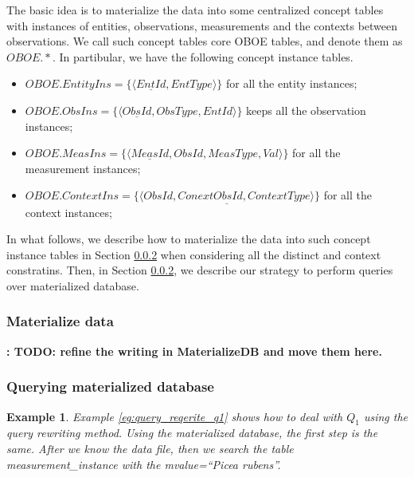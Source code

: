 \documentclass[conference]{IEEEtran}
\newtheorem{example}{Example}[section]
\begin{document}
The basic idea is to materialize the data into some centralized
concept tables with instances of entities, observations, measurements
and the contexts between observations. 
We call such concept tables core OBOE tables, and denote them as
$OBOE.*$. 
In partibular, we have the following concept instance tables. 
\begin{itemize}
\item $OBOE.EntityIns=\{\langle \underline{EntId}, EntType\rangle\}$ for all the entity instances;
\item $OBOE.ObsIns=\{\langle \underline{ObsId}, ObsType, EntId \rangle\}$ keeps all the observation instances;
\item $OBOE.MeasIns=\{\langle \underline{MeasId}, ObsId, MeasType, Val\rangle\}$ for all the measurement instances;
\item $OBOE.ContextIns =\{\langle \underline{ObsId, ConextObsId, ContextType}\rangle\}$ for all the context instances;
\end{itemize}

In what follows, we describe how to materialize the data into such
concept instance tables in Section \ref{sec:materialilzedb} when
considering all the distinct and context constratins. 
Then, in Section \ref{sec:materialilzedb}, we describe our strategy to
perform queries over materialized database. 

\subsubsection{Materialize data}\label{sec:materialilzedb}
{\bf: TODO: refine the writing in MaterializeDB and move them here.}

\subsubsection{Querying materialized database}\label{sec:materialilzedb}

\begin{example} \label{eg:materialize_db_q1}
Example \ref{eg:query_reqerite_q1} shows how to deal with $Q_1$ using
the query rewriting method. 
Using the  materialized database, the first step is the same.
After we know the data file, then we search the table {\em measurement\_instance} with the {\em mvalue=``Picea rubens''}. 
\end{example}
\end{document}
